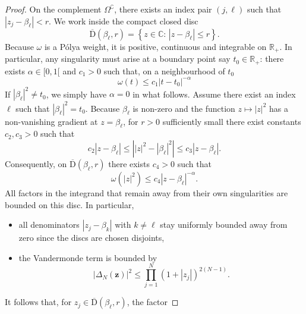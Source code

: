 \documentclass[10pt,a4paper]{amsart}
\begin{document}
\begin{proof}
    On the complement $\Omega^{\complement}$, there exists an index pair $(j,\ell)$ such that $\left|z_{j}-\beta_{\ell}\right|< r$. We work inside the compact closed disc 
    \begin{equation}
        \overline{\mathrm{D}}(\beta_{\ell},r)=\left\{ z\in\mathbb{C}:\,\left| z-\beta_{\ell} \right|\leq r \right\}.
    \end{equation}
    Because $\omega$ is a P\'olya weight, it is positive, continuous and integrable on $\mathbb{R}_{+}$. In particular, any singularity must arise at a boundary point say $t_{0}\in\mathbb{R}_{+}$: there exists $\alpha\in[0,1[$ and $c_{1}>0$ such that, on a neighbourhood of $t_{0}$
    \begin{equation*}
        \omega(t)\leq c_{1}\left|t-t_{0}\right|^{-\alpha}
    \end{equation*}
    If $\left|\beta_{\ell}\right|^{2}\neq t_{0}$, we simply have $\alpha=0$ in what follows. Assume there exist an index $\ell$ such that $\left|\beta_{\ell}\right|^{2}= t_{0}$. Because $\beta_{\ell}$ is non-zero and the function $z\mapsto \left|z\right|^{2}$ has a non-vanishing gradient at $z=\beta_{\ell}$, for $r>0$ sufficiently small there exist constants $c_{2},c_{3}>0$ such that
    \begin{equation*}
        c_{2}\left|z-\beta_{\ell}\right|\leq \left|\left|z\right|^{2}-\left|\beta_{\ell}\right|^{2}\right| \leq c_{3}\left|z-\beta_{\ell}\right|.
    \end{equation*}
    Consequently, on $\overline{\mathrm{D}}(\beta_{\ell},r)$ there exists $c_{4}>0$ such that
    \begin{equation*}
        \omega(\left|z\right|^{2})\leq c_{4}\left|z-\beta_{\ell}\right|^{-\alpha}.
    \end{equation*}
    All factors in the integrand that remain away from their own singularities are bounded on this disc. In particular,
    \begin{itemize}
        \item all denominators $\left|z_{j}-\beta_{k}\right|$ with $k\neq \ell$ stay uniformly bounded away from zero since the discs are chosen disjoints,
        \item the Vandermonde term is bounded by
        \begin{equation*}
            \left|\Delta_{N}(\mathbf{z})\right|^{2}\leq \prod_{j=1}^{N}(1+\left|z_{j}\right|)^{2(N-1)}.
        \end{equation*}
    \end{itemize}
    It follows that, for $z_{j}\in \overline{\mathrm{D}}(\beta_{\ell},r)$, the factor

\end{proof}
\end{document}
